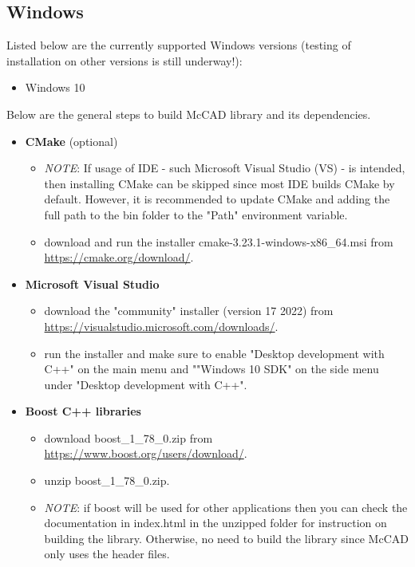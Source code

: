 \documentclass[12pt, a4paper, titlepage]{article}
\begin{document}
  \subsection{Windows}
    Listed below are the currently supported Windows versions (testing of installation on other versions is still underway!):
    \begin{itemize}
  	  \item Windows 10
    \end{itemize} 
    Below are the general steps to build McCAD library and its dependencies.
    \begin{itemize}
	  \item \textbf{CMake} (optional)
 	  \begin{itemize}
    	\item \emph{NOTE}: If usage of IDE - such Microsoft Visual Studio (VS) - is intended, then installing CMake can be skipped since most IDE builds CMake by default. However, it is recommended to update CMake and adding the full path to the bin folder to the "Path" environment variable.
 		\item download and run the installer cmake-3.23.1-windows-x86\_64.msi from \url{https://cmake.org/download/}.
  	  \end{itemize}
	  \item \textbf{Microsoft Visual Studio}
	  \begin{itemize}
		\item download the "community" installer (version 17 2022) from \\\url{https://visualstudio.microsoft.com/downloads/}.
		\item run the installer and make sure to enable "Desktop development with C++" on the main menu and ""Windows 10 SDK" on the side menu under "Desktop development with C++".
	  \end{itemize}
      \item \textbf{Boost C++ libraries}
      \begin{itemize}
    	\item download boost\_1\_78\_0.zip from \url{https://www.boost.org/users/download/}.
    	\item unzip boost\_1\_78\_0.zip.
    	\item \emph{NOTE}: if boost will be used for other applications then you can check the documentation in index.html in the unzipped folder for instruction on building the library. Otherwise, no need to build the library since McCAD only uses the header files.
      \end{itemize}

\end{itemize}
\end{document}
